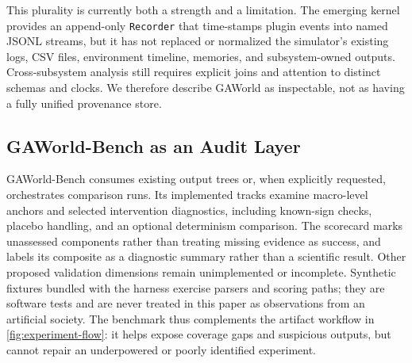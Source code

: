 This plurality is currently both a strength and a limitation.  The emerging
kernel provides an append-only \texttt{Recorder} that time-stamps plugin events
into named JSONL streams, but it has not replaced or normalized the simulator's
existing logs, CSV files, environment timeline, memories, and subsystem-owned
outputs.  Cross-subsystem analysis still requires explicit joins and attention
to distinct schemas and clocks.  We therefore describe GAWorld as inspectable,
not as having a fully unified provenance store.

\subsection{GAWorld-Bench as an Audit Layer}

GAWorld-Bench consumes existing output trees or, when explicitly requested,
orchestrates comparison runs.  Its implemented tracks examine macro-level
anchors and selected intervention diagnostics, including known-sign checks,
placebo handling, and an optional determinism comparison.  The scorecard marks
unassessed components rather than treating missing evidence as success, and
labels its composite as a diagnostic summary rather than a scientific result.
Other proposed validation dimensions remain unimplemented or incomplete.
Synthetic fixtures bundled with the harness exercise parsers and scoring paths;
they are software tests and are never treated in this paper as observations from
an artificial society.  The benchmark thus complements the artifact workflow
in \cref{fig:experiment-flow}: it helps expose coverage gaps and suspicious
outputs, but cannot repair an underpowered or poorly identified experiment.
